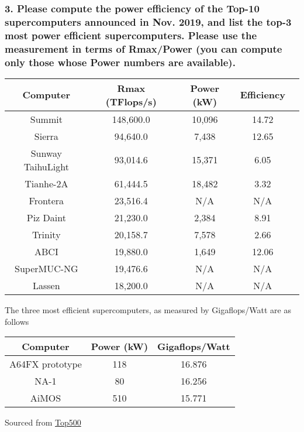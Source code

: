 \documentclass[titlepage]{article}
\begin{document}
\subsubsection*{3. Please compute the power efficiency of the Top-10 supercomputers announced in
Nov. 2019, and list the top-3 most power efficient supercomputers. Please use the
measurement in terms of Rmax/Power (you can compute only those whose Power
numbers are available).}
\begin{center}
    \begin{tabular}{ |c|c|c|c|c| } 
     \hline
     Computer & Rmax (TFlops/s) & Power (kW) & Efficiency\\ 
     \hline
        Summit & 148,600.0 & 10,096 & 14.72\\ 
        Sierra & 94,640.0 & 7,438 & 12.65\\
        Sunway TaihuLight & 93,014.6 & 15,371 & 6.05\\
        Tianhe-2A & 61,444.5 & 18,482 & 3.32\\
        Frontera & 23,516.4 & N/A & N/A \\
        Piz Daint & 21,230.0 & 2,384 & 8.91 \\
        Trinity & 20,158.7 & 7,578 & 2.66\\
        ABCI & 19,880.0 & 1,649 & 12.06\\
        SuperMUC-NG & 19,476.6 & N/A & N/A \\
        Lassen & 18,200.0 & N/A & N/A\\    
     \hline
    \end{tabular}
\end{center}
The three most efficient supercomputers, as measured by Gigaflops/Watt are as follows
\begin{center}
    \begin{tabular}{ |c|c|c| } 
     \hline
     Computer & Power (kW) & Gigaflops/Watt\\ 
     \hline
        A64FX prototype & 118 & 16.876 \\
        NA-1 & 80 & 16.256 \\
        AiMOS & 510 & 15.771 \\
     \hline
    \end{tabular}
\end{center}
Sourced from \href{https://www.top500.org/green500/list/2019/11/}{Top500}
\end{document}
